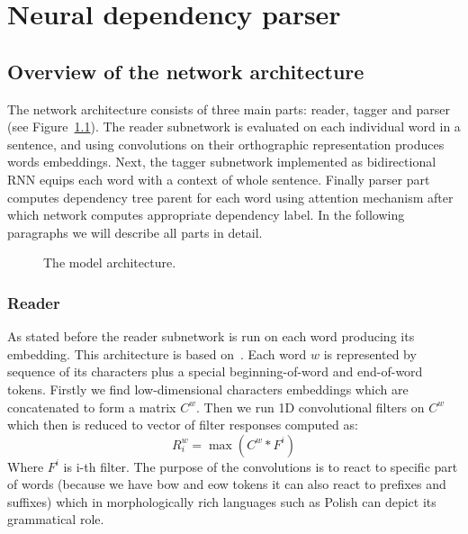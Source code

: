 \chapter{Neural dependency parser}
\section{Overview of the network architecture}
The network architecture consists of three main parts: reader, tagger and parser
(see Figure~\ref{fig:architecture}). The reader subnetwork is evaluated on
each individual word in a sentence, and using convolutions on their orthographic
representation produces words embeddings. Next, the tagger subnetwork implemented
as bidirectional RNN equips each word with a context of whole sentence. Finally
parser part computes dependency tree parent for each word using attention mechanism
\cite{vinyals_pointer_2015} after which network computes appropriate dependency label.
In the following paragraphs we will describe all parts in detail.

\begin{figure}[!htbp]
  \centering
  \caption{The model architecture.} 
  \label{fig:architecture}
\end{figure}

\subsection{Reader}
As stated before the reader subnetwork is run on each word producing its embedding.
This architecture is based on~\cite{kim_character-aware_2015}. Each word $w$
is represented by sequence of its characters plus a special beginning-of-word and
end-of-word tokens. Firstly we find low-dimensional characters embeddings which
are concatenated to form a matrix $C^w$. Then we run 1D convolutional filters
on $C^w$ which then is reduced to vector of filter responses computed as:
\begin{equation} \label{eq:filter_responses}
    R^w_i = \max( C^w \ast F^i )
\end{equation}
Where $F^i$ is i-th filter. The purpose of the convolutions is to react to
specific part of words (because we have bow and eow tokens it can also react to
prefixes and suffixes) which in morphologically rich languages such as Polish   %
can depict its grammatical role.

